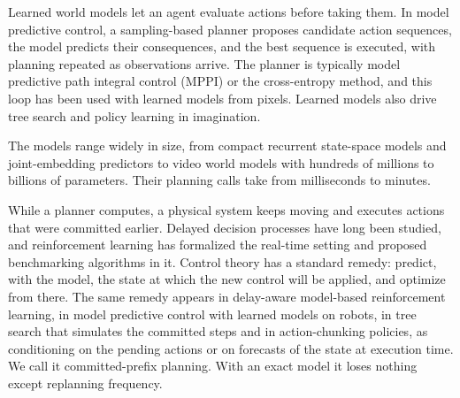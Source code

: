 \documentclass[aps,physrev,\manuscriptlayout,superscriptaddress,
  longbibliography,amsmath,amssymb]{revtex4-2}
\newcounter{algorithm}
\begin{document}
Learned world models let an agent evaluate actions before taking them\cite{ha2018world,finn2017foresight}. In model predictive control\cite{mayne2000constrained,rawlings2017mpc}, a sampling-based planner proposes candidate action sequences, the model predicts their consequences, and the best sequence is executed, with planning repeated as observations arrive. The planner is typically model predictive path integral control (MPPI)\cite{williams2016aggressive,williams2017mppi} or the cross-entropy method\cite{rubinstein1999cem,pinneri2020icem}, and this loop has been used with learned models from pixels\cite{hafner2019planet,chua2018pets,hansen2022tdmpc,hansen2023tdmpc2}. Learned models also drive tree search\cite{schrittwieser2020muzero} and policy learning in imagination\cite{hafner2020dreamer,hafner2023dreamerv3}.

The models range widely in size, from compact recurrent state-space models\cite{hafner2019planet} and joint-embedding predictors\cite{maes2026lewm,zhou2024dinowm} to video world models with hundreds of millions to billions of parameters\cite{zhao2026miniworld,wu2024ivideogpt,alonso2024diamond,nvidia2025cosmos}. Their planning calls take from milliseconds to minutes.

While a planner computes, a physical system keeps moving and executes actions that were committed earlier. Delayed decision processes have long been studied\cite{katsikopoulos2003delays}, and reinforcement learning has formalized the real-time setting\cite{ramstedt2019rtrl,xiao2020thinking,ramstedt2020random,riemer2024staggered} and proposed benchmarking algorithms in it\cite{thodoroff2022benchmarking}. Control theory has a standard remedy: predict, with the model, the state at which the new control will be applied, and optimize from there\cite{smith1957dead,findeisen2004computational,dirckx2024asap}. The same remedy appears in delay-aware model-based reinforcement learning\cite{chen2020dats,karamzade2025random}, in model predictive control with learned models on robots\cite{elasri2025rthcp}, in tree search that simulates the committed steps\cite{muppidi2026time} and in action-chunking policies\cite{zhao2023act,chi2023diffusionpolicy}, as conditioning on the pending actions or on forecasts of the state at execution time\cite{black2025rtc,shukor2025smolvla,wang2026rapac,motubrain2026wamrt,liao2025dadp,jiang2026futurertc,ye2026dreamzero}. We call it committed-prefix planning. With an exact model it loses nothing except replanning frequency\cite{findeisen2004computational}.
\end{document}
